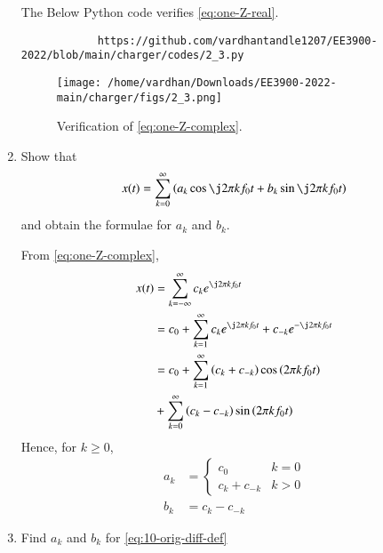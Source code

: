 \documentclass[journal,12pt,twocolumn]{IEEEtran}
\renewcommand\thesection{\arabic{section}}
\begin{document}
\begin{enumerate}[label=\thesection.\arabic*,ref=\thesection.\theenumi]
		\solution The Below Python code verifies \eqref{eq:one-Z-real}.
		\begin{lstlisting}
			https://github.com/vardhantandle1207/EE3900-2022/blob/main/charger/codes/2_3.py
		\end{lstlisting}
		
		\begin{figure}[!ht]
			\texttt{[image: /home/vardhan/Downloads/EE3900-2022-main/charger/figs/2\_3.png]}
			\caption{Verification of \eqref{eq:one-Z-complex}.}
			\label{fig:ver-complex}
		\end{figure}
		
		\item Show that 
		\begin{align}
			x(t) = \sum_{k = 0}^{\infty}\brak{a_k\cos{\j2\pi kf_0 t}+b_k\sin{\j2\pi kf_0 t}}
			\label{eq:one-Z-real}
		\end{align}
		and obtain the formulae for $a_k$ and $b_k$.
		
		\solution From \eqref{eq:one-Z-complex},
		\begin{align}
			x(t) &= \sum_{k = -\infty}^{\infty}c_ke^{\j2\pi kf_0 t} \\
			&= c_0 + \sum_{k = 1}^{\infty}c_ke^{\j2\pi kf_0t} + c_{-k}e^{-\j2\pi kf_0t} \\
			&= c_0 + \sum_{k = 1}^{\infty}\brak{c_k + c_{-k}}\cos\brak{2\pi kf_0t}  \nonumber \\
			&+ \sum_{k = 0}^{\infty}\brak{c_k - c_{-k}}\sin\brak{2\pi kf_0t}
		\end{align}
		Hence, for $k \ge 0$,
		\begin{align}
			a_k &= 
			\begin{cases}
				c_0 & k = 0 \\
				c_k + c_{-k} & k > 0
			\end{cases} \label{eq:ak} \\
			b_k &= c_k - c_{-k}
			\label{eq:bk}
		\end{align}
		\item Find $a_k$ and $b_k$ for 
		\eqref{eq:10-orig-diff-def}
		

\end{enumerate}
\end{document}
